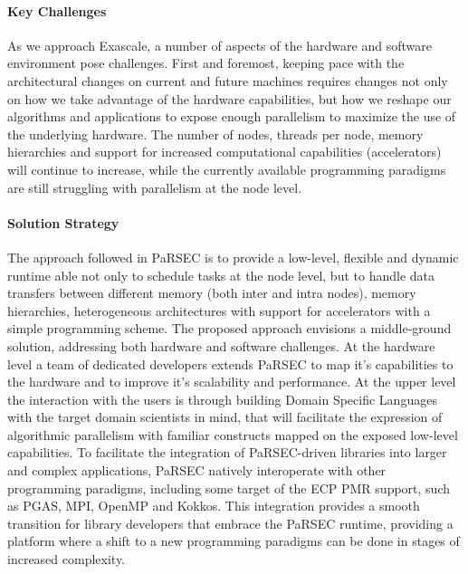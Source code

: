 \paragraph{Key  Challenges}

As we approach Exascale, a number of aspects of the hardware and software
environment pose challenges. First and foremost, keeping pace with the
architectural changes on current and future machines requires changes not only
on how we take advantage of the hardware capabilities, but how we reshape our
algorithms and applications to expose enough parallelism to maximize the use of
the underlying hardware. The number of nodes, threads per node, memory
hierarchies and support for increased computational capabilities (accelerators)
will continue to increase, while the currently available programming paradigms
are still struggling with parallelism at the node level.

\paragraph{Solution Strategy}
The approach followed in PaRSEC is to provide a low-level, flexible and dynamic
runtime able not only to schedule tasks at the node level, but to handle data
transfers between different memory (both inter and intra nodes), memory
hierarchies, heterogeneous architectures with support for accelerators with a
simple programming scheme. The proposed approach envisions a middle-ground
solution, addressing both hardware and software challenges. At the hardware
level a team of dedicated developers extends PaRSEC to map it's capabilities to
the hardware and to improve it's scalability and performance. At the upper level
the interaction with the users is through building Domain Specific Languages
with the target domain scientists in mind, that will facilitate the expression
of algorithmic parallelism with familiar constructs mapped on the exposed
low-level capabilities. To facilitate the integration of PaRSEC-driven libraries
into larger and complex applications, PaRSEC natively interoperate with other
programming paradigms, including some target of the ECP PMR support, such as
PGAS, MPI, OpenMP and Kokkos. This integration provides a smooth transition for
library developers that embrace the PaRSEC runtime, providing a platform where a
shift to a new programming paradigms can be done in stages of increased
complexity.

